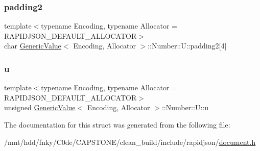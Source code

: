 \subsubsection{\texorpdfstring{padding2}{padding2}}
{\footnotesize\ttfamily template$<$typename Encoding, typename Allocator = R\+A\+P\+I\+D\+J\+S\+O\+N\+\_\+\+D\+E\+F\+A\+U\+L\+T\+\_\+\+A\+L\+L\+O\+C\+A\+T\+OR$>$ \\
char \hyperlink{classGenericValue}{Generic\+Value}$<$ Encoding, Allocator $>$\+::Number\+::\+U\+::padding2\mbox{[}4\mbox{]}}

\mbox{\label{structGenericValue_1_1Number_1_1U_a175e3a2bd43e6880791eb7c950d2f147}} 
\subsubsection{\texorpdfstring{u}{u}}
{\footnotesize\ttfamily template$<$typename Encoding, typename Allocator = R\+A\+P\+I\+D\+J\+S\+O\+N\+\_\+\+D\+E\+F\+A\+U\+L\+T\+\_\+\+A\+L\+L\+O\+C\+A\+T\+OR$>$ \\
unsigned \hyperlink{classGenericValue}{Generic\+Value}$<$ Encoding, Allocator $>$\+::Number\+::\+U\+::u}



The documentation for this struct was generated from the following file\+:\begin{DoxyCompactItemize}
\item 
/mnt/hdd/fnky/\+C0de/\+C\+A\+P\+S\+T\+O\+N\+E/clean\+\_\+build/include/rapidjson/\hyperlink{document_8h}{document.\+h}\end{DoxyCompactItemize}

